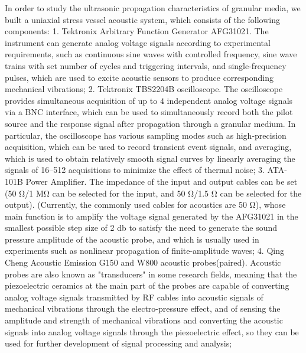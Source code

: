 \begin{digest}
    In order to study the ultrasonic propagation characteristics of granular media, we built a uniaxial stress vessel acoustic system, which consists of the following components: 
    1. Tektronix Arbitrary Function Generator AFG31021. The instrument can generate analog voltage signals according to experimental requirements, such as continuous sine waves with controlled frequency, sine wave trains with set number of cycles and triggering intervals, and single-frequency pulses, which are used to excite acoustic sensors to produce corresponding mechanical vibrations; 
    2. Tektronix TBS2204B oscilloscope. The oscilloscope provides simultaneous acquisition of up to $4$ independent analog voltage signals via a BNC interface, which can be used to simultaneously record both the pilot source and the response signal after propagation through a granular medium. In particular, the oscilloscope has various sampling modes such as high-precision acquisition, which can be used to record transient event signals, and averaging, which is used to obtain relatively smooth signal curves by linearly averaging the signals of \numrange{16}{512} acquisitions to minimize the effect of thermal noise;
    3. ATA-101B Power Amplifier. The impedance of the input and output cables can be set (50 \unit{\ohm}/1 \unit{\mega\ohm} can be selected for the input, and 50 \unit{\ohm}/1.5 \unit{\ohm} can be selected for the output). (Currently, the commonly used cables for acoustics are 50 \unit{\ohm}), whose main function is to amplify the voltage signal generated by the AFG31021 in the smallest possible step size of 2 \unit{\decibel} to satisfy the need to generate the sound pressure amplitude of the acoustic probe, and which is usually used in experiments such as nonlinear propagation of finite-amplitude waves;
    4. Qing Cheng Acoustic Emission G150 and W800 acoustic probes(paired). Acoustic probes are also known as "transducers" in some research fields, meaning that the piezoelectric ceramics at the main part of the probes are capable of converting analog voltage signals transmitted by RF cables into acoustic signals of mechanical vibrations through the electro-pressure effect, and of sensing the amplitude and strength of mechanical vibrations and converting the acoustic signals into analog voltage signals through the piezoelectric effect, so they can be used for further development of signal processing and analysis;

\end{digest}
